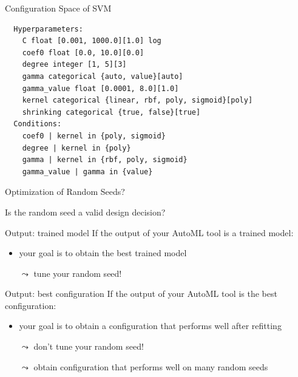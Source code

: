 \begin{frame}[c, fragile]{Configuration Space of SVM}

\begin{verbatim}
  Hyperparameters:
    C float [0.001, 1000.0][1.0] log
    coef0 float [0.0, 10.0][0.0]
    degree integer [1, 5][3]
    gamma categorical {auto, value}[auto]
    gamma_value float [0.0001, 8.0][1.0]
    kernel categorical {linear, rbf, poly, sigmoid}[poly]
    shrinking categorical {true, false}[true]
  Conditions:
    coef0 | kernel in {poly, sigmoid}
    degree | kernel in {poly}
    gamma | kernel in {rbf, poly, sigmoid}
    gamma_value | gamma in {value}
\end{verbatim}

\end{frame}
\begin{frame}[c, fragile]{Optimization of Random Seeds?}

Is the random seed a valid design decision?

\medskip

\begin{block}{Output: trained model}
	If the output of your AutoML tool is a trained model:
	\begin{itemize}
		\item your goal is to obtain the best trained model
		\item[$\leadsto$] tune your random seed!
	\end{itemize}
\end{block}

\pause	
\medskip
	
\begin{block}{Output: best configuration}
	If the output of your AutoML tool is the best configuration:
	\begin{itemize}
		\item your goal is to obtain a configuration that performs well after refitting 
		\item[$\leadsto$] don't tune your random seed!
		\item[$\leadsto$] obtain configuration that performs well on many random seeds
	\end{itemize}
\end{block}


\end{frame}
